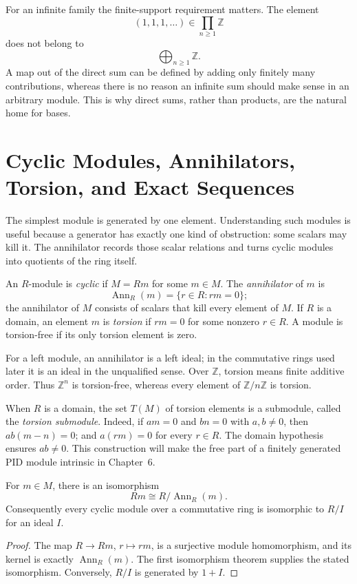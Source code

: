 For an infinite family the finite-support requirement matters. The element
\[
(1,1,1,\ldots)\in\prod_{n\geq1}\mathbb Z
\]
does not belong to
\[
\bigoplus_{n\geq1}\mathbb Z.
\]
A map out of the direct sum can be defined
by adding only finitely many contributions, whereas there is no reason an
infinite sum should make sense in an arbitrary module. This is why direct
sums, rather than products, are the natural home for bases.

\section{Cyclic Modules, Annihilators, Torsion, and Exact Sequences}
The simplest module is generated by one element. Understanding such modules
is useful because a generator has exactly one kind of obstruction: some
scalars may kill it. The annihilator records those scalar relations and turns
cyclic modules into quotients of the ring itself.

\begin{definition}
An \(R\)-module is \emph{cyclic} if \(M=Rm\) for some \(m\in M\). The
\emph{annihilator} of \(m\) is
\[\operatorname{Ann}_R(m)=\{r\in R:rm=0\};\]
the annihilator of \(M\) consists of scalars that kill every element of
\(M\). If \(R\) is a domain, an element \(m\) is \emph{torsion} if
\(rm=0\) for some nonzero \(r\in R\). A module is torsion-free if its only
torsion element is zero.
\end{definition}

For a left module, an annihilator is a left ideal; in the commutative rings
used later it is an ideal in the unqualified sense. Over \(\mathbb Z\),
torsion means finite additive order. Thus \(\mathbb Z^n\) is torsion-free,
whereas every element of \(\mathbb Z/n\mathbb Z\) is torsion.

When \(R\) is a domain, the set \(T(M)\) of torsion elements is a submodule,
called the \emph{torsion submodule}. Indeed, if \(am=0\) and \(bn=0\) with
\(a,b\ne0\), then \(ab(m-n)=0\); and \(a(rm)=0\) for every \(r\in R\).
The domain hypothesis ensures \(ab\ne0\). This construction will make the
free part of a finitely generated PID module intrinsic in Chapter~6.

\begin{theorem}
For \(m\in M\), there is an isomorphism
\[Rm\cong R/\operatorname{Ann}_R(m).\]
Consequently every cyclic module over a commutative ring is isomorphic to
\(R/I\) for an ideal \(I\).
\end{theorem}
\begin{proof}
The map \(R\to Rm\), \(r\mapsto rm\), is a surjective module
homomorphism, and its kernel is exactly \(\operatorname{Ann}_R(m)\). The
first isomorphism theorem supplies the stated isomorphism. Conversely,
\(R/I\) is generated by \(1+I\).
\end{proof}

